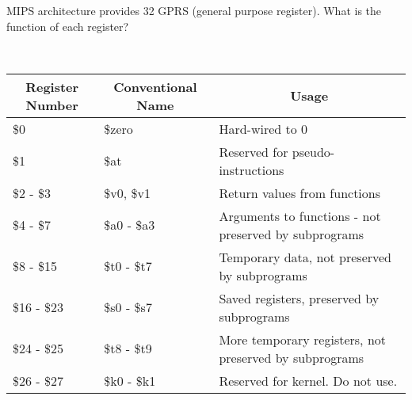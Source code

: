 \begin{exercise}[]{MIPS architecture provides 32 GPRS (general purpose register). What is the function of each register?  }
  \begin{solution}
  \par{~}

\begin{table}[htbp]
    \begin{tabular}{@{}lll@{}}
    \toprule
    \multicolumn{1}{c}{\textbf{Register   Number}} & \multicolumn{1}{c}{\textbf{Conventional Name}} & \multicolumn{1}{c}{\textbf{Usage}}                                 \\ \midrule
    \$0                                            & \$zero                                         & Hard-wired to 0                                                    \\
    \$1                                            & \$at                                           & Reserved for pseudo-instructions                                   \\
    \$2 - \$3                                        & \$v0, \$v1                                       & Return values from functions                                       \\
    \$4 - \$7                                        & \$a0 - \$a3                                      & Arguments to functions - not preserved by subprograms              \\
    \$8 - \$15                                       & \$t0 - \$t7                                      & Temporary data, not preserved by subprograms                       \\
    \$16 - \$23                                      & \$s0 - \$s7                                      & Saved registers, preserved by subprograms                          \\
    \$24 - \$25                                      & \$t8 - \$t9                                      & More temporary registers, not preserved by subprograms             \\
    \$26 - \$27                                      & \$k0 - \$k1                                      & Reserved for kernel. Do not use.                                   \\

\end{tabular}
\end{table}
\end{solution}
\end{exercise}
